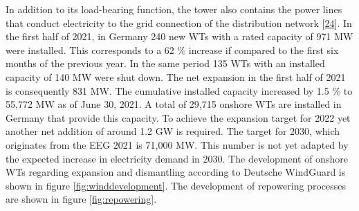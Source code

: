 \documentclass[a4paper,11pt]{article}
\begin{document}
In addition to its load-bearing function, the tower also contains the power lines that conduct electricity to the grid connection of the distribution network {[}\protect\hyperlink{ref-NetzKonstrukteur.16.11.2020}{24}{]}. In the first half of 2021, in Germany 240 new WTs with a rated capacity of 971 MW were installed. This corresponds to a 62 \% increase if compared to the first six months of the previous year. In the same period 135 WTs with an installed capacity of 140 MW were shut down. The net expansion in the first half of 2021 is consequently 831 MW. The cumulative installed capacity increased by 1.5 \% to 55,772 MW as of June 30, 2021. A total of 29,715 onshore WTs are installed in Germany that provide this capacity. To achieve the expansion target for 2022 yet another net addition of around 1.2 GW is required. The target for 2030, which originates from the EEG 2021 is 71,000 MW. This number is not yet adapted by the expected increase in electricity demand in 2030. The development of onshore WTs regarding expansion and dismantling according to Deutsche WindGuard is shown in figure \ref{fig:winddevelopment}. The development of repowering processes are shown in figure \ref{fig:repowering}.
\end{document}
